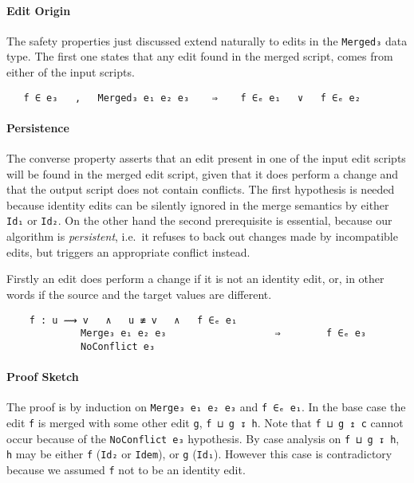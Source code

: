 \documentclass[preprint]{sigplanconf}
\begin{document}
    \paragraph{Edit Origin}
    The safety properties just discussed extend naturally to edits in the 
    \texttt{Merged₃} data type.
    The first one states that any edit found in the merged script,
    comes from either of the input scripts.
\begin{verbatim}
   f ∈ e₃   ,   Merged₃ e₁ e₂ e₃    ⇒    f ∈ₑ e₁   ∨   f ∈ₑ e₂
\end{verbatim}
    
    \paragraph{Persistence}
    The converse property asserts that an edit present in one of the input
    edit scripts will be found in the merged edit script, given that it does
    perform a change and that the output script does not contain conflicts.
    The first hypothesis is needed because identity edits can be silently 
    ignored in the merge semantics by either \texttt{Id₁} or
    \texttt{Id₂}.
    On the other hand the second prerequisite is essential, because 
    our algorithm is \emph{persistent}, i.e.\ it refuses to back out changes 
    made by incompatible edits, but triggers an appropriate conflict instead.

    Firstly an edit does perform a change if it is not an identity edit, or, in 
    other words if the source and the target values are different.
				
\begin{verbatim}
    f : u ⟿ v   ∧   u ≢ v   ∧   f ∈ₑ e₁
             Merge₃ e₁ e₂ e₃                   ⇒        f ∈ₑ e₃
             NoConflict e₃ 
\end{verbatim}
    \paragraph{Proof Sketch}
    The proof is by induction on \texttt{Merge₃ e₁ e₂ e₃} and \texttt{f ∈ₑ e₁}.
    In the base case the edit \texttt{f} is merged with some other edit \texttt{g},
    \texttt{f ⊔ g ↧ h}. Note that \texttt{f ⊔ g ↥ c} cannot occur because of
    the \texttt{NoConflict e₃} hypothesis. By case analysis on \texttt{f ⊔ g ↧ h},
    \texttt{h} may be either \texttt{f} (\texttt{Id₂} or \texttt{Idem}), or 
    \texttt{g} (\texttt{Id₁}). However this case is contradictory because we
    assumed \texttt{f} not to be an identity edit.
    
\end{document}
